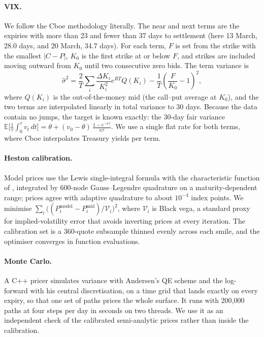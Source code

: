 \documentclass[11pt]{article}
\theoremstyle{remark}
\newcommand{\dK}{\Delta K}
\begin{document}
\paragraph{VIX.}
We follow the Cboe methodology literally.
The near and next terms are the expiries with more than 23 and fewer than 37 days to settlement (here 13 March, 28.0 days, and 20 March, 34.7 days).
For each term, $F$ is set from the strike with the smallest $|C - P|$, $K_0$ is the first strike at or below $F$, and strikes are included moving outward from $K_0$ until two consecutive zero bids.
The term variance is
\begin{equation}
  \hat\sigma^2 = \frac{2}{T}\sum_i \frac{\dK_i}{K_i^2} e^{RT} Q(K_i) - \frac{1}{T}\left(\frac{F}{K_0} - 1\right)^2,
  \label{eq:vix}
\end{equation}
where $Q(K_i)$ is the out-of-the-money mid (the call--put average at $K_0$), and the two terms are interpolated linearly in total variance to 30 days.
Because the data contain no jumps, the target is known exactly: the 30-day fair variance
$\mathbb{E}\big[\tfrac{1}{\tau}\int_0^\tau v_t\,dt\big] = \theta + (v_0 - \theta)\,\frac{1 - e^{-\kappa\tau}}{\kappa\tau}$.
We use a single flat rate for both terms, where Cboe interpolates Treasury yields per term.

\paragraph{Heston calibration.}
Model prices use the Lewis single-integral formula with the characteristic function of \citet{albrecher2007}, integrated by 600-node Gauss--Legendre quadrature on a maturity-dependent range; prices agree with adaptive quadrature to about $10^{-4}$ index points.
We minimise $\sum_i \big((P^{\text{model}}_i - P^{\text{mid}}_i)/\mathcal{V}_i\big)^2$, where $\mathcal{V}_i$ is Black vega, a standard proxy for implied-volatility error that avoids inverting prices at every iteration.
The calibration set is a 360-quote subsample thinned evenly across each smile, and the optimiser converges in \CalNfev{} function evaluations.

\paragraph{Monte Carlo.}
A C++ pricer simulates variance with Andersen's QE scheme and the log-forward with his central discretisation, on a time grid that lands exactly on every expiry, so that one set of paths prices the whole surface.
It runs with 200{,}000 paths at four steps per day in \MCSec{} seconds on two threads.
We use it as an independent check of the calibrated semi-analytic prices rather than inside the calibration.
\end{document}
